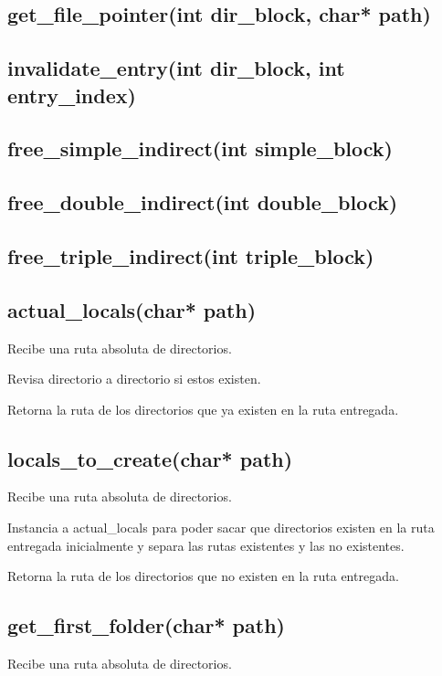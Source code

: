 \documentclass[12pt]{article}
\begin{document}
\subsection{get\_file\_pointer(int dir\_block, char* path)}

\subsection{invalidate\_entry(int dir\_block, int entry\_index)}

\subsection{free\_simple\_indirect(int simple\_block)}

\subsection{free\_double\_indirect(int double\_block)}

\subsection{free\_triple\_indirect(int triple\_block)}

\subsection{actual\_locals(char* path)}
Recibe una ruta absoluta de directorios.

Revisa directorio a directorio si estos existen.

Retorna la ruta de los directorios que ya existen en la ruta entregada.

\subsection{locals\_to\_create(char* path)}
Recibe una ruta absoluta de directorios.

Instancia a actual\_locals para poder sacar que directorios existen en la ruta entregada inicialmente y separa las rutas existentes y las no existentes.

Retorna la ruta de los directorios que no existen en la ruta entregada.


\subsection{get\_first\_folder(char* path)}
Recibe una ruta absoluta de directorios.
\end{document}
